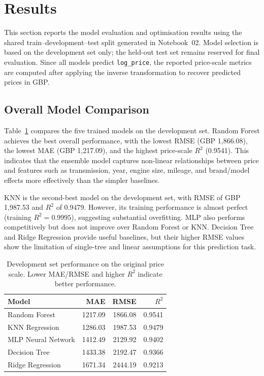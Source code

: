\section{Results}
\label{sec:results}

This section reports the model evaluation and optimisation results using the shared train--development--test split generated in Notebook~02. Model selection is based on the development set only; the held-out test set remains reserved for final evaluation. Since all models predict \texttt{log\_price}, the reported price-scale metrics are computed after applying the inverse transformation to recover predicted prices in GBP.

\subsection{Overall Model Comparison}
\label{sec:overall_results}

Table~\ref{tab:model_comparison} compares the five trained models on the development set. Random Forest achieves the best overall performance, with the lowest RMSE (GBP 1,866.08), the lowest MAE (GBP 1,217.09), and the highest price-scale $R^2$ (0.9541). This indicates that the ensemble model captures non-linear relationships between price and features such as transmission, year, engine size, mileage, and brand/model effects more effectively than the simpler baselines.

KNN is the second-best model on the development set, with RMSE of GBP 1,987.53 and $R^2$ of 0.9479. However, its training performance is almost perfect (training $R^2 = 0.9995$), suggesting substantial overfitting. MLP also performs competitively but does not improve over Random Forest or KNN. Decision Tree and Ridge Regression provide useful baselines, but their higher RMSE values show the limitation of single-tree and linear assumptions for this prediction task.

\begin{table}[h]
\centering
\small
\setlength{\tabcolsep}{3pt}
\begin{tabular}{@{}lrrr@{}}
\toprule
\textbf{Model} & \textbf{MAE} & \textbf{RMSE} & \textbf{$R^2$} \\
\midrule
Random Forest      & 1217.09 & 1866.08 & 0.9541 \\
KNN Regression     & 1286.03 & 1987.53 & 0.9479 \\
MLP Neural Network & 1412.49 & 2129.92 & 0.9402 \\
Decision Tree      & 1433.38 & 2192.47 & 0.9366 \\
Ridge Regression   & 1671.34 & 2444.19 & 0.9213 \\
\bottomrule
\end{tabular}
\caption{Development set performance on the original price scale. Lower MAE/RMSE and higher $R^2$ indicate better performance.}
\label{tab:model_comparison}
\end{table}

